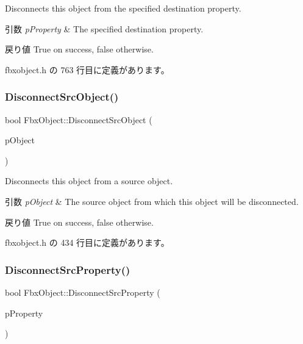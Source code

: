 Disconnects this object from the specified destination property. 
\begin{DoxyParams}{引数}
{\em p\+Property} & The specified destination property. \\
\hline
\end{DoxyParams}
\begin{DoxyReturn}{戻り値}
{\ttfamily True} on success, {\ttfamily false} otherwise. 
\end{DoxyReturn}


 fbxobject.\+h の 763 行目に定義があります。

\mbox{\label{class_fbx_object_a1ff942832a9a9d829988c757899b6655}} 
\subsubsection{\texorpdfstring{Disconnect\+Src\+Object()}{DisconnectSrcObject()}}
{\footnotesize\ttfamily bool Fbx\+Object\+::\+Disconnect\+Src\+Object (\begin{DoxyParamCaption}\item[{\hyperlink{class_fbx_object}{Fbx\+Object} $\ast$}]{p\+Object }\end{DoxyParamCaption})\hspace{0.3cm}{\ttfamily [inline]}}

Disconnects this object from a source object. 
\begin{DoxyParams}{引数}
{\em p\+Object} & The source object from which this object will be disconnected. \\
\hline
\end{DoxyParams}
\begin{DoxyReturn}{戻り値}
{\ttfamily True} on success, {\ttfamily false} otherwise. 
\end{DoxyReturn}


 fbxobject.\+h の 434 行目に定義があります。

\mbox{\label{class_fbx_object_a545423b1e5060fcad8784bd0aa0432b6}} 
\subsubsection{\texorpdfstring{Disconnect\+Src\+Property()}{DisconnectSrcProperty()}}
{\footnotesize\ttfamily bool Fbx\+Object\+::\+Disconnect\+Src\+Property (\begin{DoxyParamCaption}\item[{const \hyperlink{class_fbx_property}{Fbx\+Property} \&}]{p\+Property }\end{DoxyParamCaption})\hspace{0.3cm}{\ttfamily [inline]}}

